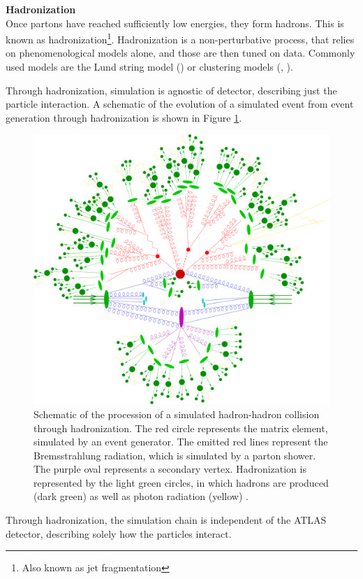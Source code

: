 \noindent\textbf{Hadronization}\\
\indent Once partons have reached sufficiently low energies, they form hadrons. This is known as hadronization\footnote{Also known as jet fragmentation}. Hadronization is a non-perturbative process, that relies on phenomenological models alone, and those are then tuned on data. Commonly used models are the Lund string model \cite{lund-string} (\PYTHIA) or clustering models \cite{clustering-hadronization} (\HERWIG, \SHERPA).

Through hadronization, simulation is agnostic of detector, describing just the particle interaction. A schematic of the evolution of a simulated event from event generation through hadronization is shown in Figure \ref{fig:parton-shower-sketch}.

\begin{figure}[!thp]
    \centering
    \includegraphics[width=.70\textwidth]{chapters/chapter3_eventreco/images/parton-shower.png}

    \caption[Schematic of the procession of a simulated hadron-hadron collision.]{Schematic of the procession of a simulated hadron-hadron collision through hadronization. The red circle represents the matrix element, simulated by an event generator. The emitted red lines represent the Bremsstrahlung radiation, which is simulated by a parton shower. The purple oval represents a secondary vertex. Hadronization is represented by the light green circles, in which hadrons are produced (dark green) as well as photon radiation (yellow) \cite{parton-shower-sketch}.}
    \label{fig:parton-shower-sketch}
\end{figure}

Through hadronization, the simulation chain is independent of the ATLAS detector, describing solely how the particles interact.


